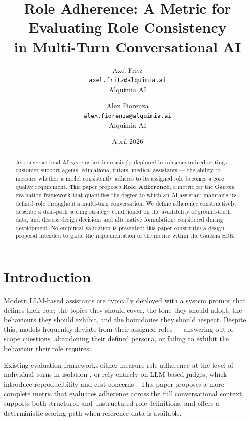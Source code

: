 \documentclass[11pt,a4paper]{article}
\title{\textbf{Role Adherence: A Metric for Evaluating Role Consistency\\
in Multi-Turn Conversational AI}}
\author{
    Axel Fritz\\
    \texttt{axel.fritz@alquimia.ai}\\
    Alquimia AI
    \and
    Alex Fiorenza\\
    \texttt{alex.fiorenza@alquimia.ai}\\
    Alquimia AI
}
\date{April 2026}
\begin{document}
\maketitle

\begin{abstract}
As conversational AI systems are increasingly deployed in role-constrained
settings --- customer support agents, educational tutors, medical assistants
--- the ability to measure whether a model consistently adheres to its
assigned role becomes a core quality requirement. This paper proposes
\textbf{Role Adherence}, a metric for the Gaussia evaluation framework that
quantifies the degree to which an AI assistant maintains its defined role
throughout a multi-turn conversation. We define adherence constructively,
describe a dual-path scoring strategy conditioned on the availability of
ground-truth data, and discuss design decisions and alternative formulations
considered during development. No empirical validation is presented; this
paper constitutes a design proposal intended to guide the implementation of
the metric within the Gaussia SDK.
\end{abstract}

\section{Introduction}

Modern LLM-based assistants are typically deployed with a system prompt that
defines their role: the topics they should cover, the tone they should adopt,
the behaviours they should exhibit, and the boundaries they should respect.
Despite this, models frequently deviate from their assigned roles --- answering
out-of-scope questions, abandoning their defined persona, or failing to exhibit
the behaviour their role requires.

Existing evaluation frameworks either measure role adherence at the level of
individual turns in isolation \citep{zheng2023judging}, or rely entirely on
LLM-based judges, which introduce reproducibility and cost concerns
\citep{deriu2021survey}. This paper proposes a more complete metric that
evaluates adherence across the full conversational context, supports both
structured and unstructured role definitions, and offers a deterministic
scoring path when reference data is available.

\end{document}
